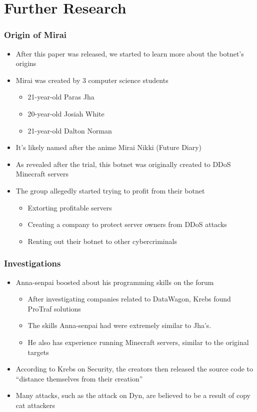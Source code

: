 \documentclass{beamer}
\begin{document}
\section{Further Research}

\begin{frame}
	\frametitle{Origin of Mirai}
	\begin{itemize}
		\item<+-> After this paper was released, we started to learn more about the botnet's origins
		\item<+-> Mirai was created by 3 computer science students
		\begin{itemize}
			\item<+-> 21-year-old Paras Jha
			\item<+-> 20-year-old Josiah White
			\item<+-> 21-year-old Dalton Norman
		\end{itemize}
		\item<+-> It's likely named after the anime Mirai Nikki (Future Diary)
		\item<+-> As revealed after the trial, this botnet was originally created to DDoS Minecraft servers
		\item<+-> The group allegedly started trying to profit from their botnet
		\begin{itemize}
			\item<+-> Extorting profitable servers
			\item<+-> Creating a company to protect server owners from DDoS attacks
			\item<+-> Renting out their botnet to other cybercriminals
		\end{itemize}
	\end{itemize}
\end{frame}

\begin{frame}
	\frametitle{Investigations}
	\begin{itemize}
		\item<+-> Anna-senpai boosted about his programming skills on the forum
		\begin{itemize}
			\item<+-> After investigating companies related to DataWagon, Krebs found ProTraf solutions
			\item<+-> The skills Anna-senpai had were extremely similar to Jha's.
			\item<+-> He also has experience running Minecraft servers, similar to the original targets
		\end{itemize}
		\item<+-> According to Krebs on Security, the creators then released the source code to ``distance themselves from their creation''
		\item<+-> Many attacks, such as the attack on Dyn, are believed to be a result of copy cat attackers
	\end{itemize}
\end{frame}
\end{document}
